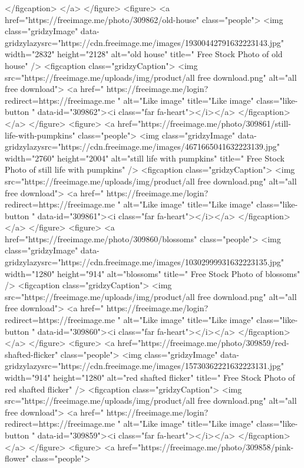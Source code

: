 </figcaption>
</a>
</figure>
<figure>
<a href="https://freeimage.me/photo/309862/old-house" class="people">
<img class="gridzyImage" data-gridzylazysrc="https://cdn.freeimage.me/images/19300442791632223143.jpg" width="2832" height="2128" alt="old house" title=" Free Stock Photo of old house" />
<figcaption class="gridzyCaption">
<img src="https://freeimage.me/uploads/img/product/all free download.png" alt="all free download">
<a href=" https://freeimage.me/login?redirect=https://freeimage.me " alt="Like image" title="Like image" class="like-button  " data-id="309862"><i class="far fa-heart"></i></a>
</figcaption>
</a>
</figure>
<figure>
<a href="https://freeimage.me/photo/309861/still-life-with-pumpkins" class="people">
<img class="gridzyImage" data-gridzylazysrc="https://cdn.freeimage.me/images/4671665041632223139.jpg" width="2760" height="2004" alt="still life with pumpkins" title=" Free Stock Photo of still life with pumpkins" />
<figcaption class="gridzyCaption">
<img src="https://freeimage.me/uploads/img/product/all free download.png" alt="all free download">
<a href=" https://freeimage.me/login?redirect=https://freeimage.me " alt="Like image" title="Like image" class="like-button  " data-id="309861"><i class="far fa-heart"></i></a>
</figcaption>
</a>
</figure>
<figure>
<a href="https://freeimage.me/photo/309860/blossoms" class="people">
<img class="gridzyImage" data-gridzylazysrc="https://cdn.freeimage.me/images/10302999931632223135.jpg" width="1280" height="914" alt="blossoms" title=" Free Stock Photo of blossoms" />
<figcaption class="gridzyCaption">
<img src="https://freeimage.me/uploads/img/product/all free download.png" alt="all free download">
<a href=" https://freeimage.me/login?redirect=https://freeimage.me " alt="Like image" title="Like image" class="like-button  " data-id="309860"><i class="far fa-heart"></i></a>
</figcaption>
</a>
</figure>
<figure>
<a href="https://freeimage.me/photo/309859/red-shafted-flicker" class="people">
<img class="gridzyImage" data-gridzylazysrc="https://cdn.freeimage.me/images/15730362221632223131.jpg" width="914" height="1280" alt="red shafted flicker" title=" Free Stock Photo of red shafted flicker" />
<figcaption class="gridzyCaption">
<img src="https://freeimage.me/uploads/img/product/all free download.png" alt="all free download">
<a href=" https://freeimage.me/login?redirect=https://freeimage.me " alt="Like image" title="Like image" class="like-button  " data-id="309859"><i class="far fa-heart"></i></a>
</figcaption>
</a>
</figure>
<figure>
<a href="https://freeimage.me/photo/309858/pink-flower" class="people">
